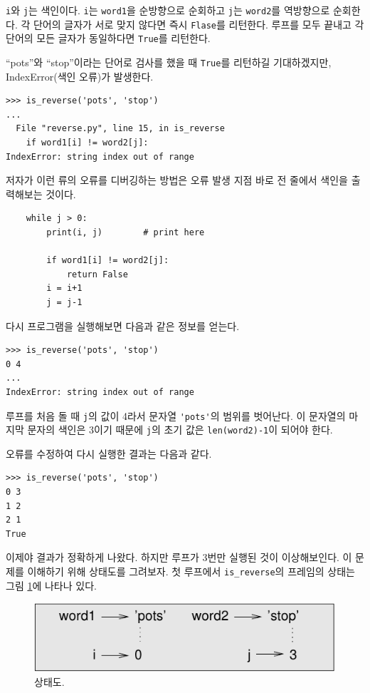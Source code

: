 \documentclass[10pt]{book}
\begin{document}
{\tt i}와 {\tt j}는 색인이다.  {\tt i}는 {\tt word1}을 순방향으로
순회하고 {\tt j}는 {\tt word2}를 역방향으로 순회한다.  각 단어의 글자가
서로 맞지 않다면 즉시 {\tt Flase}를 리턴한다.  루프를 모두 끝내고 각
단어의 모든 글자가 동일하다면 {\tt True}를 리턴한다.

``pots''와 ``stop''이라는 단어로 검사를 했을 때 {\tt True}를 리턴하길
기대하겠지만, IndexError(색인 오류)가 발생한다.

\begin{verbatim}
>>> is_reverse('pots', 'stop')
...
  File "reverse.py", line 15, in is_reverse
    if word1[i] != word2[j]:
IndexError: string index out of range
\end{verbatim}
%
저자가 이런 류의 오류를 디버깅하는 방법은 오류 발생 지점 바로 전 줄에서
색인을 출력해보는 것이다.

\begin{verbatim}
    while j > 0:
        print(i, j)        # print here
        
        if word1[i] != word2[j]:
            return False
        i = i+1
        j = j-1
\end{verbatim}
%
다시 프로그램을 실행해보면 다음과 같은 정보를 얻는다. 

\begin{verbatim}
>>> is_reverse('pots', 'stop')
0 4
...
IndexError: string index out of range
\end{verbatim}
%
루프를 처음 돌 때 {\tt j}의 값이 4라서 문자열 \verb"'pots'"의 범위를
벗어난다.  이 문자열의 마지막 문자의 색인은 3이기 때문에 {\tt j}의 초기
값은 {\tt len(word2)-1}이 되어야 한다.

오류를 수정하여 다시 실행한 결과는 다음과 같다. 

\begin{verbatim}
>>> is_reverse('pots', 'stop')
0 3
1 2
2 1
True
\end{verbatim}
%
이제야 결과가 정확하게 나왔다.  하지만 루프가 3번만 실행된 것이
이상해보인다.  이 문제를 이해하기 위해 상태도를 그려보자.  첫 루프에서
\verb"is_reverse"의 프레임의 상태는 그림 \ref{fig.state4}에 나타나
있다.
 

\begin{figure}
\centerline
{\includegraphics[scale=0.8]{figs/state4.pdf}}
\caption{상태도.}
\label{fig.state4}
\end{figure}
\end{document}
